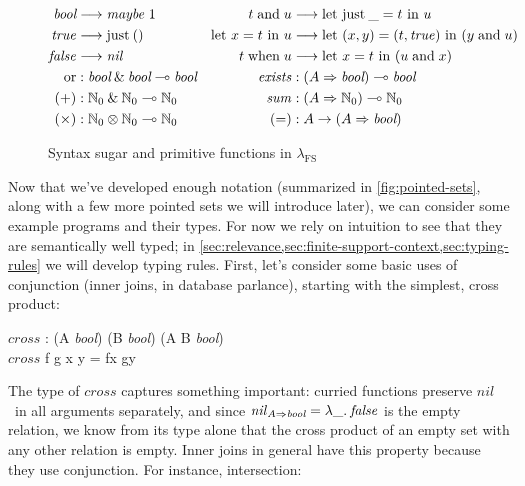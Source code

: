 \documentclass[runningheads]{llncs}
\newcommand\fslang{\ensuremath{\lambda_{\mathrm{FS}}}}
\newcommand\name[1]{\ensuremath{\mathit{#1}}}
\newcommand\<\:                 %
\newcommand\fnspace{\<}         %
\newcommand\fn[1]{\lambda{#1}.\fnspace}
\newcommand\lto\multimap        %
\newcommand\fto\Rightarrow
\newcommand\with{\mathbin{\&}}
\newcommand\ox\otimes
\newcommand\typename\textit
\newcommand\bool{\typename{bool}}
\newcommand\maybe{\typename{maybe}}
\newcommand\maybeof[1]{\ensuremath{\maybe~{#1}}}
\newcommand\kword[1]{\ensuremath{\textrm{#1}}}
\newcommand\cname\textrm
\newcommand\cjust{\cname{just}}
\newcommand\nil{\name{nil}}
\newcommand\true{\name{true}}
\newcommand\false{\name{false}}
\newcommand\letin[1]{\kword{let}~{#1}~\kword{in}~}
\newcommand\leteq[2]{\letin{{#1} = {#2}}}
\newcommand\tjust[1]{\cjust\<{#1}}
\newcommand\letjust[3]{\leteq{\tjust {#1}}{#2}{#3}}
\newcommand\tand{\mathrel{\kword{and}}}
\newcommand\whenkword{\kword{when}}
\newcommand\when{\mathrel{\whenkword}}
\newcommand\pwild{\text{\textunderscore}}
\newcommand\nat{\mathbb{N}}
\newcommand\natz{\ensuremath{\nat_0}}
\begin{document}
\newcommand\mult\times

\begin{figure}[t]
  \newcommand\desugar{\longrightarrow}
  \begin{align*}
    \bool &\desugar \maybeof 1 &
    t \tand u &\desugar \letjust \pwild t u
    \\
    \true &\desugar \tjust () &
    \leteq x t u &\desugar \letin{(x,y) = (t, \true)} (y \tand u)
    \\
    \false &\desugar \nil &
    t \when u &\desugar \leteq x t {(u \tand x)}
    \\
    \kword{or} &: \bool \with \bool \lto \bool
    &
    \name{exists} &: (A \fto \bool) \lto \bool
    \\
    (+) &: \natz \with \natz \lto \natz
    &
    \name{sum} &: (A \fto \natz) \lto \natz
    \\
    (\mult) &: \natz \ox \natz \lto \natz &
    ({=}) &: A \to (A \fto \bool)
  \end{align*}
  \caption{Syntax sugar and primitive functions in \fslang}
  \label{fig:primitives}
\end{figure}

Now that we've developed enough notation (summarized in \cref{fig:pointed-sets}, along with a few more pointed sets we will introduce later), we can consider some example programs and their types.
For now we rely on intuition to see that they are semantically well typed; in \cref{sec:relevance,sec:finite-support-context,sec:typing-rules} we will develop typing rules.
First, let's consider some basic uses of conjunction (inner joins, in database parlance), starting with the simplest, cross product:

\begin{code}
  \name{cross} : (A \fto \bool) \lto (B \fto \bool) \lto (A \fto B \fto \bool)\\
  \name{cross} \<f \<g \<x \<y = f\<x \tand g\<y
\end{code}

\noindent
%
%
The type of \name{cross} captures something important:
curried functions preserve \nil\ in all arguments separately, and since $\nil_{A \fto \bool} = \fn{\pwild} \false$ is the %
empty relation, we know from its type alone that the cross product of an empty set with any other relation is empty.
Inner joins in general have this property because they use conjunction.
For instance, intersection:
\end{document}
